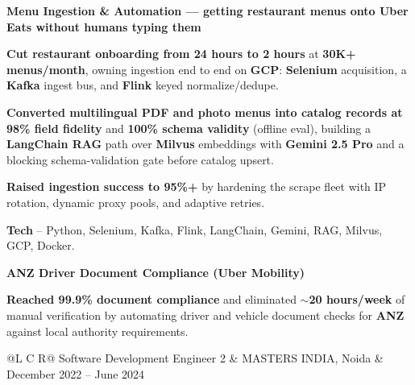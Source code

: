 \textcolor{Project}{\textbf{Menu Ingestion \& Automation --- getting restaurant menus onto Uber Eats without humans typing them}}
\vspace{-0.6ex}
\begin{zitemize}
    \item \textbf{Cut restaurant onboarding from 24 hours to 2 hours} at \textbf{30K+ menus/month}, owning ingestion end to end on \textbf{GCP}: \textbf{Selenium} acquisition, a \textbf{Kafka} ingest bus, and \textbf{Flink} keyed normalize/dedupe.
    \item \textbf{Converted multilingual PDF and photo menus into catalog records at 98\% field fidelity} and \textbf{100\% schema validity} (offline eval), building a \textbf{LangChain RAG} path over \textbf{Milvus} embeddings with \textbf{Gemini 2.5 Pro} and a blocking schema-validation gate before catalog upsert.
    \item \textbf{Raised ingestion success to 95\%+} by hardening the scrape fleet with IP rotation, dynamic proxy pools, and adaptive retries.
    \item \textbf{Tech} -- Python, Selenium, Kafka, Flink, LangChain, Gemini, RAG, Milvus, GCP, Docker.
\end{zitemize}
\vspace{0.5ex}

\textcolor{Project}{\textbf{ANZ Driver Document Compliance (Uber Mobility)}}
\vspace{-0.6ex}
\begin{zitemize}
    \item \textbf{Reached 99.9\% document compliance} and eliminated $\sim$\textbf{20 hours/week} of manual verification by automating driver and vehicle document checks for \textbf{ANZ} against local authority requirements.
\end{zitemize}

\vspace{0.6ex}
\noindent
\begin{tabularx}{\textwidth}{@{}L C R@{}}
\textcolor{role}{Software Development Engineer 2} & \textcolor{company}{MASTERS INDIA, Noida} & \textcolor{date}{December 2022 -- June 2024}\\
\end{tabularx}
\vspace{-1.6ex}

